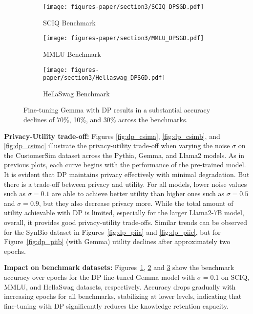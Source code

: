 \begin{figure*}[h!]
    \centering
        \begin{subfigure}{.3\linewidth}
       \texttt{[image: figures-paper/section3/SCIQ\_DPSGD.pdf]}
        \caption{SCIQ Benchmark}
        \label{fig:sciq_dpsgd}
    \end{subfigure}
    \begin{subfigure}{.3\linewidth}
       \texttt{[image: figures-paper/section3/MMLU\_DPSGD.pdf]}
        \caption{MMLU Benchmark}
        \label{fig:mmlu_dpsgd}
    \end{subfigure}
     \begin{subfigure}{.3\linewidth}
       \texttt{[image: figures-paper/section3/Hellaswag\_DPSGD.pdf]}
        \caption{HellaSwag Benchmark}
        \label{fig:hs_dpsgd}
    \end{subfigure}
    \caption{
    Fine-tuning Gemma with DP results in a substantial accuracy declines of 70\%, 10\%, and 30\% across the benchmarks.
    }
    \label{fig:bench-dpsgd}
\end{figure*}

\noindent
\textbf{Privacy-Utility trade-off:}
Figures \ref{fig:dp_csima}, \ref{fig:dp_csimb}, and \ref{fig:dp_csimc} illustrate the privacy-utility trade-off when varying the noise $\sigma$ on the CustomerSim dataset across the Pythia, Gemma, and Llama2 models.
As in previous plots, each curve begins with the performance of the pre-trained model.
It is evident that DP maintains privacy effectively with minimal degradation.
But there is a trade-off between privacy and utility.
For all models, lower noise values such as $\sigma = 0.1$ are able to achieve better utility than higher ones such as $\sigma = 0.5$ and $\sigma = 0.9$, but they also decrease privacy more.
While the total amount of utility achievable with DP is limited, especially for the larger Llama2-7B model, overall, it provides good privacy-utility trade-offs.
Similar trends can be observed for the SynBio dataset in Figures~\ref{fig:dp_piia} and \ref{fig:dp_piic}, but for Figure~\ref{fig:dp_piib} (with Gemma) utility declines after approximately two epochs.  

\noindent
\textbf{Impact on benchmark datasets:} Figures~\ref{fig:sciq_dpsgd}, \ref{fig:mmlu_dpsgd} and \ref{fig:hs_dpsgd} show the benchmark accuracy over epochs for the DP fine-tuned Gemma model with $\sigma=0.1$ on SCIQ, MMLU, and HellaSwag datasets, respectively. Accuracy drops gradually with increasing epochs for all benchmarks, stabilizing at lower levels, indicating that fine-tuning with DP significantly reduces the knowledge retention capacity.

